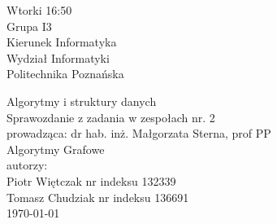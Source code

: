 \documentclass[polish,polish,a4paper]{article}
\begin{document}
	
		\begin{titlepage}
			\begin{flushright}
				{ Wtorki 16:50\\
					Grupa I3\\
					Kierunek Informatyka\\
					Wydział Informatyki\\
					Politechnika Poznańska}
			\end{flushright}
		\vspace*{\fill}
		\begin{center}
			{\Large Algorytmy i struktury danych \\[0.1cm]
				Sprawozdanie z zadania w zespołach nr. 2\\[0.1cm]
				prowadząca: dr hab. inż. Małgorzata Sterna, prof PP}\\
			{\Huge Algorytmy  Grafowe\\ [0.4cm]}
			{\large autorzy:\\[0.1cm]}
			{\large Piotr Więtczak nr indeksu 132339\\[0.1cm] Tomasz Chudziak nr indeksu 136691}\\[0.5cm]
			\today
		\end{center}
		\vspace*{\fill}
	\end{titlepage}
\end{document}
